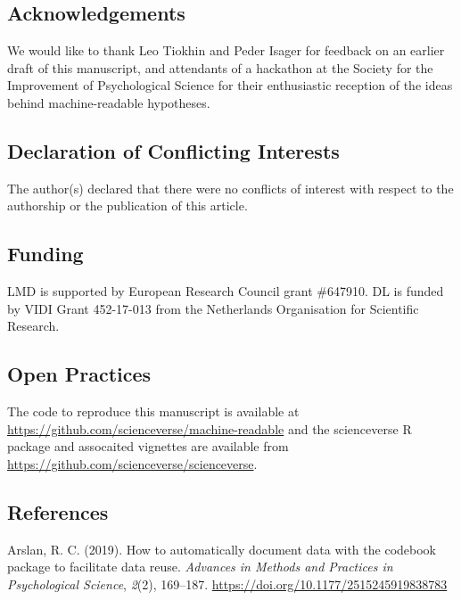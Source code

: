\documentclass[
  english,
  doc,floatsintext]{apa6}
\begin{document}
\hypertarget{acknowledgements}{%
\subsection{Acknowledgements}\label{acknowledgements}}

We would like to thank Leo Tiokhin and Peder Isager for feedback on an earlier draft of this manuscript, and attendants of a hackathon at the Society for the Improvement of Psychological Science for their enthusiastic reception of the ideas behind machine-readable hypotheses.

\hypertarget{declaration-of-conflicting-interests}{%
\subsection{Declaration of Conflicting Interests}\label{declaration-of-conflicting-interests}}

The author(s) declared that there were no conflicts of interest with respect to the authorship or the publication of this article.

\hypertarget{funding}{%
\subsection{Funding}\label{funding}}

LMD is supported by European Research Council grant \#647910. DL is funded by VIDI Grant 452-17-013 from the Netherlands Organisation for Scientific Research.

\hypertarget{open-practices}{%
\subsection{Open Practices}\label{open-practices}}

The code to reproduce this manuscript is available at \url{https://github.com/scienceverse/machine-readable} and the scienceverse R package and assocaited vignettes are available from \url{https://github.com/scienceverse/scienceverse}.

\newpage

\hypertarget{references}{%
\subsection{References}\label{references}}

\begingroup
\setlength{\parindent}{-0.5in}
\setlength{\leftskip}{0.5in}

\hypertarget{refs}{}
\leavevmode\hypertarget{ref-arslan2019}{}%
Arslan, R. C. (2019). How to automatically document data with the codebook package to facilitate data reuse. \emph{Advances in Methods and Practices in Psychological Science}, \emph{2}(2), 169--187. \url{https://doi.org/10.1177/2515245919838783}
\end{document}
